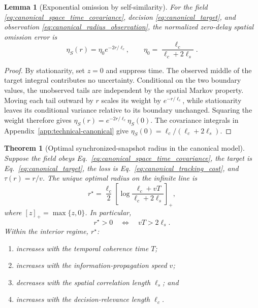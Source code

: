 \documentclass[11pt]{article}
\newtheorem{lemma}{Lemma}
\newtheorem{theorem}{Theorem}
\begin{document}
\begin{lemma}[Exponential omission by self-similarity]
\label{prop:canonical_eta_S}
For the field \eqref{eq:canonical_space_time_covariance}, decision
\eqref{eq:canonical_target}, and observation
\eqref{eq:canonical_radius_observation}, the normalized zero-delay spatial
omission error is
\begin{equation}
\eta_S(r)=\eta_0e^{-2r/\ell_c},\qquad
\eta_0=\frac{\ell_c}{\ell_c+2\ell_s}.
\label{eq:canonical_eta_S}
\end{equation}
\end{lemma}

\begin{proof}
By stationarity, set $z=0$ and suppress time. The observed middle of the
target integral contributes no uncertainty. Conditional on the two boundary
values, the unobserved tails are independent by the spatial Markov property.
Moving each tail outward by $r$ scales its weight by $e^{-r/\ell_c}$,
while stationarity leaves its conditional variance relative to its boundary
unchanged. Squaring the weight therefore gives
$\eta_S(r)=e^{-2r/\ell_c}\eta_S(0)$.
The covariance integrals in Appendix~\ref{app:technical-canonical} give
$\eta_S(0)=\ell_c/(\ell_c+2\ell_s)$.
\end{proof}

\begin{theorem}[Optimal synchronized-snapshot radius in the canonical model]
\label{thm:canonical_optimal_radius}
Suppose the field obeys Eq.~\eqref{eq:canonical_space_time_covariance},
the target is Eq.~\eqref{eq:canonical_target}, the loss is
Eq.~\eqref{eq:canonical_tracking_cost}, and $\tau(r)=r/v$.
The unique optimal radius on the infinite line is
\begin{equation}
\boxed{r^\star=\frac{\ell_c}{2}
\left[\log\frac{\ell_c+vT}{\ell_c+2\ell_s}\right]_+,}
\label{eq:canonical_optimal_radius}
\end{equation}
where $[z]_+=\max\{z,0\}$. In particular,
\begin{equation}
r^\star>0\quad\Longleftrightarrow\quad vT>2\ell_s.
\label{eq:positive_radius_condition}
\end{equation}
Within the interior regime, $r^\star$:
\begin{enumerate}
    \item increases with the temporal coherence time $T$;
    \item increases with the information-propagation speed $v$;
    \item decreases with the spatial correlation length $\ell_s$; and
    \item increases with the decision-relevance length $\ell_c$.
\end{enumerate}
\end{theorem}
\end{document}
